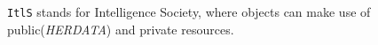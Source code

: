 \verb|ItlS| stands for Intelligence Society, where objects can make use of public(\textit{HERDATA}) and private resources.

